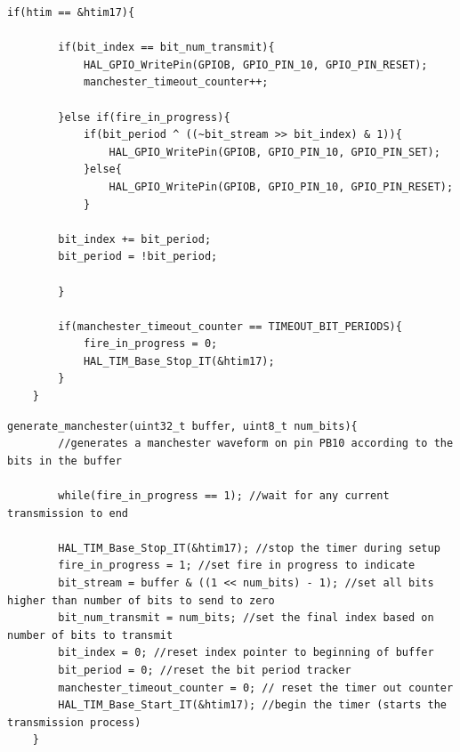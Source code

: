 \begin{lstlisting}[style=cstyle, caption=Timer Interrupt Handler Implementation\label{lst:manchester_generate_interrupt_routine}]
	if(htim == &htim17){
	
		if(bit_index == bit_num_transmit){
			HAL_GPIO_WritePin(GPIOB, GPIO_PIN_10, GPIO_PIN_RESET);
			manchester_timeout_counter++;
		
		}else if(fire_in_progress){
			if(bit_period ^ ((~bit_stream >> bit_index) & 1)){
				HAL_GPIO_WritePin(GPIOB, GPIO_PIN_10, GPIO_PIN_SET);
			}else{
				HAL_GPIO_WritePin(GPIOB, GPIO_PIN_10, GPIO_PIN_RESET);
			}
			
		bit_index += bit_period;
		bit_period = !bit_period;
		
		}
		
		if(manchester_timeout_counter == TIMEOUT_BIT_PERIODS){
			fire_in_progress = 0;
			HAL_TIM_Base_Stop_IT(&htim17);
		}
	}
\end{lstlisting}



\begin{lstlisting}[style=cstyle, caption=Generate Manchester Function Implementation\label{lst:generate_manchester_implementation}]
	generate_manchester(uint32_t buffer, uint8_t num_bits){
		//generates a manchester waveform on pin PB10 according to the bits in the buffer
		
		while(fire_in_progress == 1); //wait for any current transmission to end
		
		HAL_TIM_Base_Stop_IT(&htim17); //stop the timer during setup
		fire_in_progress = 1; //set fire in progress to indicate
		bit_stream = buffer & ((1 << num_bits) - 1); //set all bits higher than number of bits to send to zero
		bit_num_transmit = num_bits; //set the final index based on number of bits to transmit
		bit_index = 0; //reset index pointer to beginning of buffer
		bit_period = 0; //reset the bit period tracker
		manchester_timeout_counter = 0; // reset the timer out counter
		HAL_TIM_Base_Start_IT(&htim17); //begin the timer (starts the transmission process)
	}
\end{lstlisting}


